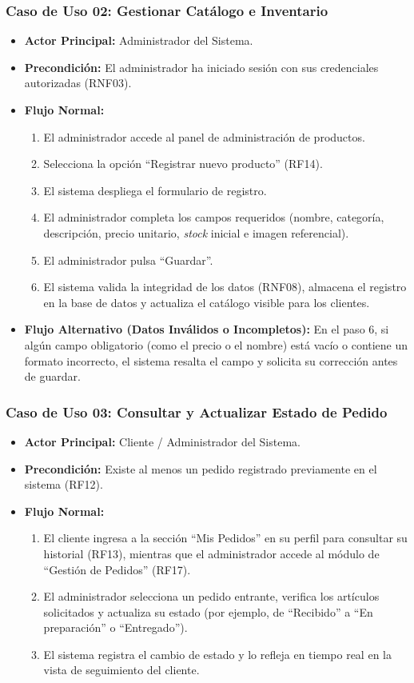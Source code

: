 \subsubsection*{Caso de Uso 02: Gestionar Catálogo e Inventario}
\begin{itemize}
    \item \textbf{Actor Principal:} Administrador del Sistema.
    \item \textbf{Precondición:} El administrador ha iniciado sesión con sus credenciales autorizadas (RNF03).
    \item \textbf{Flujo Normal:}
    \begin{enumerate}
        \item El administrador accede al panel de administración de productos.
        \item Selecciona la opción ``Registrar nuevo producto'' (RF14).
        \item El sistema despliega el formulario de registro.
        \item El administrador completa los campos requeridos (nombre, categoría, descripción, precio unitario, \textit{stock} inicial e imagen referencial).
        \item El administrador pulsa ``Guardar''.
        \item El sistema valida la integridad de los datos (RNF08), almacena el registro en la base de datos y actualiza el catálogo visible para los clientes.
    \end{enumerate}
    \item \textbf{Flujo Alternativo (Datos Inválidos o Incompletos):} En el paso 6, si algún campo obligatorio (como el precio o el nombre) está vacío o contiene un formato incorrecto, el sistema resalta el campo y solicita su corrección antes de guardar.
\end{itemize}

\subsubsection*{Caso de Uso 03: Consultar y Actualizar Estado de Pedido}
\begin{itemize}
    \item \textbf{Actor Principal:} Cliente / Administrador del Sistema.
    \item \textbf{Precondición:} Existe al menos un pedido registrado previamente en el sistema (RF12).
    \item \textbf{Flujo Normal:}
    \begin{enumerate}
        \item El cliente ingresa a la sección ``Mis Pedidos'' en su perfil para consultar su historial (RF13), mientras que el administrador accede al módulo de ``Gestión de Pedidos'' (RF17).
        \item El administrador selecciona un pedido entrante, verifica los artículos solicitados y actualiza su estado (por ejemplo, de ``Recibido'' a ``En preparación'' o ``Entregado'').
        \item El sistema registra el cambio de estado y lo refleja en tiempo real en la vista de seguimiento del cliente.
    \end{enumerate}
\end{itemize}

